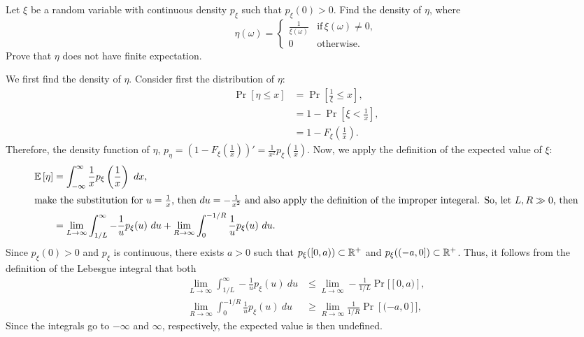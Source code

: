 \begin{problem}{6}
Let $\xi$ be a random variable with continuous density $p_\xi$ such that $p_\xi(0) > 0$. Find the density of $\eta$, where 
\begin{equation*}
    \eta(\omega) = \begin{cases}
        \frac{1}{\xi(\omega)} &\text{if}\,\xi(\omega) \neq 0, \\
        0&\text{otherwise}.
    \end{cases}
\end{equation*}
Prove that $\eta$ does not have finite expectation.
\end{problem}
\begin{solution}
    We first find the density of $\eta$. Consider first the distribution of $\eta$:
    \begin{align*}
        \Pr[\eta \leq x] &= \Pr\left[\frac{1}{\xi} \leq x\right], \\
        &= 1 - \Pr\left[\xi < \frac{1}{x}\right], \\
        &= 1 - F_\xi\left(\frac{1}{x}\right).
    \end{align*}
    Therefore, the density function of $\eta$, $p_\eta = \left(1-F_\xi\left(\frac{1}{x}\right)\right)' = \frac{1}{x^2}p_\xi\left(\frac{1}{x}\right)$. Now, we apply the definition of the expected value of $\xi$:
    \begin{align*}
        \mathbb{E}\left[\eta\right] &= \int_{-\infty}^\infty \frac{1}{x}p_\xi\left(\frac{1}{x}\right)~dx, \\
        \intertext{make the substitution for $u = \frac{1}{x}$, then $du=-\frac{1}{x^2}$ and also apply the definition of the improper integeral. So, let $L,R \gg 0$, then}
        &= \lim_{L\to\infty} \int_{1/L}^\infty -\frac{1}{u}p_\xi(u)~du + \lim_{R\to\infty}\int_0^{-1/R} \frac{1}{u}p_\xi(u)~du. 
    \end{align*}
    Since $p_\xi(0) > 0$ and $p_\xi$ is continuous, there exists $a > 0$ such that $p_\xi([0,a)) \subset \mathbb{R}^+$ and $p_\xi((-a,0]) \subset \mathbb{R}^+$. Thus, it follows from the definition of the Lebesgue integral that both 
    \begin{align*}
        \lim_{L\to\infty} \int_{1/L}^\infty -\frac{1}{u}p_\xi(u)~du &\leq \lim_{L\to\infty} -\frac{1}{1/L} \Pr[[0,a)], \\
        \lim_{R \to\infty} \int_0^{-1/R} \frac{1}{u} p_\xi(u)~du &\geq \lim_{R\to\infty} \frac{1}{1/R} \Pr[(-a,0]],  
    \end{align*}
    Since the integrals go to $-\infty$ and $\infty$, respectively, the expected value is then undefined. 
\end{solution}

